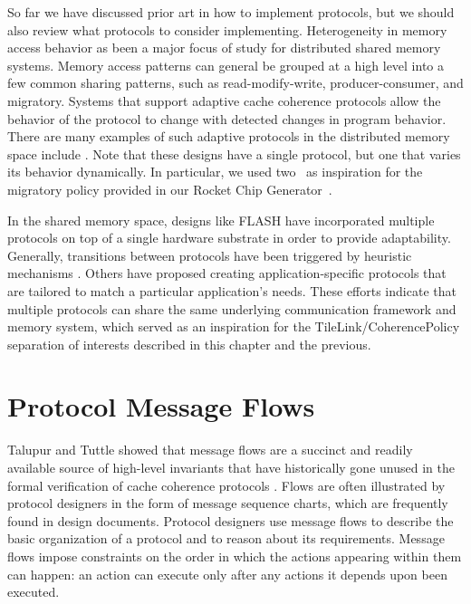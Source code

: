 So far we have discussed prior art in how to implement protocols,
but we should also review what protocols to consider implementing.
Heterogeneity in memory access behavior as been a major focus of study for distributed shared memory systems.
Memory access patterns can general be grouped at a high level into a few common sharing patterns, such as read-modify-write, producer-consumer, and migratory. Systems that support adaptive cache coherence protocols allow the behavior of the protocol to change with detected changes in program behavior.  There are many examples of such adaptive protocols in the distributed memory space include \cite{amza-hpca97,lebeck-archnews95,stenstrom-isca93,cox-isca93}. Note that these designs have a single protocol, but one that varies its behavior dynamically.
In particular, we used two~\cite{stenstrom-isca93,cox-isca93} as inspiration for the migratory policy provided in our Rocket Chip Generator~\cite{rocket}.

In the shared memory space, designs like FLASH \cite{kuskin-archnews94} have incorporated multiple protocols on top of a single hardware substrate in order to provide adaptability. Generally, transitions between protocols have been triggered by heuristic mechanisms \cite{mukherjee-archnews98}. Others \cite{chandra-sigplan96,falsafi-sc94} have proposed creating application-specific protocols that are tailored to match a particular application's needs.
These efforts indicate that multiple protocols can share the same underlying communication framework and memory system,
which served as an inspiration for the TileLink/CoherencePolicy separation of interests described in this chapter and the previous.

\section{Protocol Message Flows}

Talupur and Tuttle showed that message flows are a succinct and
readily available source of high-level invariants that have historically gone
unused in the formal verification of cache coherence protocols \cite{talupur2008going}.
Flows are often illustrated by protocol designers in the form of message sequence charts,
which are frequently found in design documents.
Protocol designers use message flows to describe
the basic organization of a protocol and to reason about its requirements.
Message flows impose constraints on the order in which the actions appearing within them can happen:
an action can execute only after any actions it depends upon been executed.

